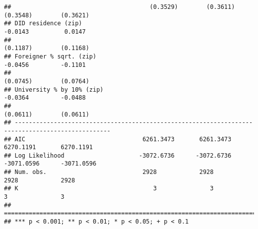 \documentclass[
]{article}
\begin{document}
\begin{verbatim}
##                                       (0.3529)        (0.3611)        (0.3548)        (0.3621)   
## DID residence (zip)                                                   -0.0143          0.0147    
##                                                                       (0.1187)        (0.1168)   
## Foreigner % sqrt. (zip)                                               -0.0456         -0.1101    
##                                                                       (0.0745)        (0.0764)   
## University % by 10% (zip)                                             -0.0364         -0.0488    
##                                                                       (0.0611)        (0.0611)   
## -------------------------------------------------------------------------------------------------
## AIC                                 6261.3473       6261.3473       6270.1191       6270.1191    
## Log Likelihood                     -3072.6736      -3072.6736      -3071.0596      -3071.0596    
## Num. obs.                           2928            2928            2928            2928         
## K                                      3               3               3               3         
## =================================================================================================
## *** p < 0.001; ** p < 0.01; * p < 0.05; + p < 0.1
\end{verbatim}
\end{document}
